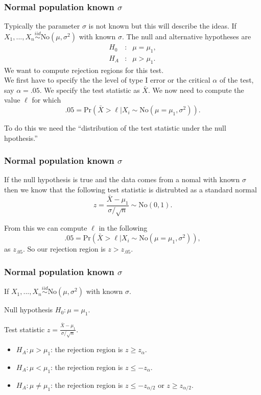 \begin{frame}[fragile]\frametitle{Normal population known $\sigma$}

{\tiny
Typically the parameter $\sigma$ is not known but this
will describe the ideas. 
If $X_1,...,X_n \stackrel{iid}{\sim} \mbox{No}(\mu,\sigma^2)$
with known $\sigma$.
The null and alternative hypotheses are
\begin{eqnarray*}
H_0&:& \mu= \mu_1, \\
H_A&:& \mu >  \mu_1.
\end{eqnarray*}
We want to compute rejection regions for this test. \\
We first have to specify the the level of type I error
or the critical $\alpha$ of the test, say $\alpha =.05$.
We specify the test statistic as $\bar{X}$. We now
need to compute the value $\ell$ for which
$$.05 = \mbox{Pr}(\bar{X} > \ell | X_i \sim \mbox{No}(\mu=\mu_1,\sigma^2)).$$

To do this we need the ``distribution of the test statistic under the
null hpothesis.''

 }
\end{frame}


\begin{frame}[fragile]\frametitle{Normal population known $\sigma$}

{\tiny

If the null hypothesis is true and the data comes from
a nomal with known $\sigma$ then we know that the following
test statistic is distrubted as a standard normal
$$z = \frac{\bar{X}-\mu_1}{\sigma/\sqrt{n}} \sim \mbox{No}(0,1).$$

From this we can compute $\ell$ in the following
$$.05 = \mbox{Pr}(\bar{X} > \ell | X_i \sim
\mbox{No}(\mu=\mu_1,\sigma^2)),$$
as $z_{.05}$. So our rejection region is $z>z_{.05}$.
}

\end{frame}



\begin{frame}[fragile]\frametitle{Normal population known $\sigma$}

{\tiny
If $X_1,...,X_n \stackrel{iid}{\sim} \mbox{No}(\mu,\sigma^2)$
with known $\sigma$.

Null hypothesis $H_0: \mu= \mu_1$.

Test statistic $z = \frac{\bar{X}-\mu_1}{\sigma/\sqrt{n}}.$

\begin{itemize}

\item $H_A: \mu > \mu_1$: the rejection region is $z \geq z_{\alpha}$.
\item $H_A: \mu < \mu_1$: the rejection region is $z \leq -z_{\alpha}$.
\item $H_A: \mu \neq \mu_1$: the rejection region is $z \leq
  -z_{\alpha/2}$ or $z \geq z_{\alpha/2}$.

\end{itemize}
}

\end{frame}


